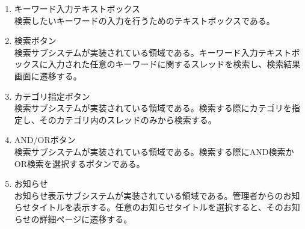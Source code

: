\documentclass[a4j]{jarticle}
\begin{document}
\begin{enumerate}
  \renewcommand{\labelenumi}{\textcircled{\scriptsize \theenumi}}

  \item キーワード入力テキストボックス\\
  検索したいキーワードの入力を行うためのテキストボックスである。
  \item 検索ボタン\\
  検索サブシステムが実装されている領域である。キーワード入力テキストボックスに入力された任意のキーワードに関するスレッドを検索し、検索結果画面に遷移する。
  \item カテゴリ指定ボタン\\
  検索サブシステムが実装されている領域である。検索する際にカテゴリを指定し、そのカテゴリ内のスレッドのみから検索する。
  \item AND/ORボタン\\
  検索サブシステムが実装されている領域である。検索する際にAND検索かOR検索を選択するボタンである。
  \item お知らせ\\
  お知らせ表示サブシステムが実装されている領域である。管理者からのお知らせタイトルを表示する。任意のお知らせタイトルを選択すると、そのお知らせの詳細ページに遷移する。
\end{enumerate}
\end{document}
